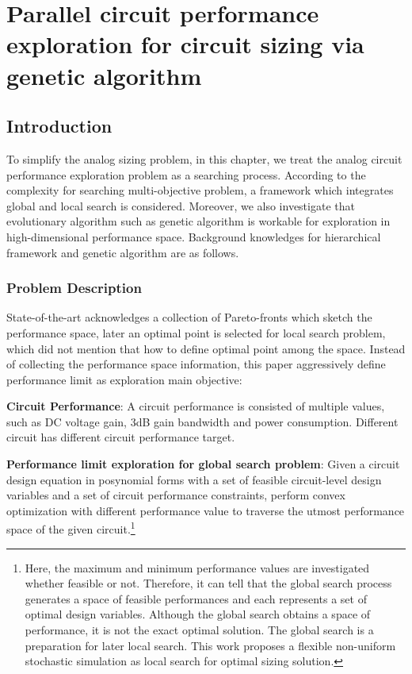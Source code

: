 
\chapter{Parallel circuit performance exploration for circuit sizing via genetic algorithm}\label{chap:PAGE}
  \section{Introduction}\label{sec:PAGEIntro}
    To simplify the analog sizing problem, in this chapter, we treat the analog circuit performance exploration problem as a searching process. According to the complexity for searching multi-objective problem, a framework which integrates global and local search is considered. Moreover, we also investigate that evolutionary algorithm such as genetic algorithm is workable for exploration in high-dimensional performance space. Background knowledges for hierarchical framework and genetic algorithm are as follows.
    \subsection{Problem Description} 
      State-of-the-art acknowledges a collection of Pareto-fronts which sketch the performance space, later an optimal point is selected for local search problem, which did not mention that how to define optimal point among the space. Instead of collecting the performance space information, this paper aggressively define performance limit as exploration main objective:

      
      
      \begin{defi}
        {\bf Circuit Performance}: A circuit performance is consisted of multiple values, such as DC voltage gain, 3dB gain bandwidth and power consumption. Different circuit has different circuit performance target.
      \end{defi}

      \begin{defi}
        {\bf Performance limit exploration for global search problem}: Given a circuit design equation in posynomial forms with a set of feasible circuit-level design variables and a set of circuit performance constraints, perform convex optimization with different performance value to traverse the utmost performance space of the given circuit.\footnote{Here, the maximum and minimum performance values are investigated whether feasible or not. Therefore, it can tell that the global search process generates a space of feasible performances and each represents a set of optimal design variables. Although the global search obtains a space of performance, it is not the exact optimal solution. The global search is a preparation for later local search. This work proposes a flexible non-uniform stochastic simulation as local search for optimal sizing solution. }
      \end{defi}


